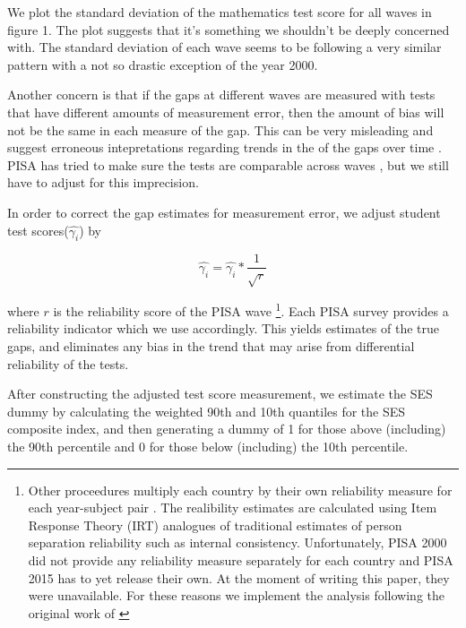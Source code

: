 \documentclass[11pt, a4paper]{article}\usepackage[]{graphicx}\usepackage[]{color}
\begin{document}
We plot the standard deviation of the mathematics test score for all waves in figure 1. The plot suggests that it's something we shouldn't be deeply concerned with. The standard deviation of each wave seems to be following a very similar pattern with a not so drastic exception of the year 2000.

Another concern is that if the gaps at different waves are measured with tests that have different amounts of measurement error, then the amount of bias will not be the same in each measure of the gap. This can be very misleading and suggest erroneous intepretations regarding trends in the of the gaps over time \citep{reardon2011}. PISA has tried to make sure the tests are comparable across waves \citep{pisa2012_technical}, but we still have to adjust for this imprecision.

In order to correct the gap estimates for measurement error, we adjust student test scores(\begin{math} \hat{\gamma_i} \end{math}) by

\begin{equation}
\hat{\gamma_i} = \hat{\gamma_i} * \frac{1}{\sqrt{r}}
\end{equation}

where \begin{math}r\end{math} is the reliability score of the PISA wave \footnote{Other proceedures multiply each country by their own reliability measure for each year-subject pair \citep{anna2016_global}. The realibility estimates are calculated using Item Response Theory (IRT) analogues of traditional estimates of person separation reliability such as internal consistency. Unfortunately, PISA 2000 did not provide any reliability measure separately for each country and PISA 2015 has to yet release their own. At the moment of writing this paper, they were unavailable. For these reasons we implement the analysis following the original work of \citet{reardon2011}}. Each PISA survey provides a reliability indicator which we use accordingly. This yields estimates of the true gaps, and eliminates any bias in the trend that may arise from differential reliability of the tests.

After constructing the adjusted test score measurement, we estimate the SES dummy by calculating the weighted 90th and 10th quantiles for the SES composite index, and then generating a dummy of 1 for those above (including) the 90th percentile and 0 for those below (including) the 10th percentile.
\end{document}
